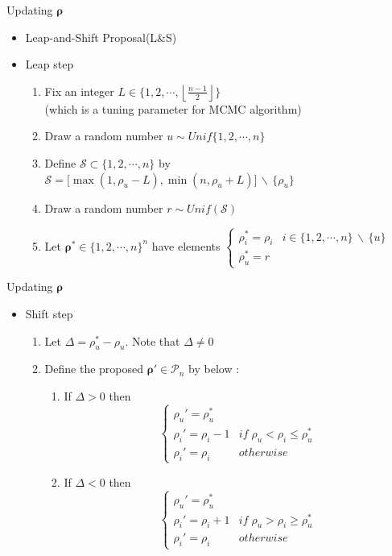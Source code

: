 \documentclass[11pt]{beamer}
\newcommand{\diff}{\,\backslash\,}
\newcommand{\floor}[1]{\left\lfloor #1 \right\rfloor}
\begin{document}
\begin{frame}{Updating $\boldsymbol{\rho}$}
\begin{itemize}
    \item Leap-and-Shift Proposal(L\&S)
    \item Leap step
        \begin{enumerate}
            \item Fix an integer $L\in \{1,2,\cdots, \floor{\frac{n-1}{2}}\}$ \\
            (which is a tuning parameter for MCMC algorithm)
            \item Draw a random number $u\sim Unif\{1,2,\cdots, n\}$
            \item Define $\mathcal{S}\subset \{1,2,\cdots, n\}$ by $\mathcal{S}=\big[\max (1, \rho_u-L), \min (n, \rho_u+L)\big]\diff\{\rho_u\}$
            \item Draw a random number $r\sim Unif(\mathcal{S})$
            \item Let $\boldsymbol{\rho}^*\in \{1,2,\cdots, n\}^n$ have elements $\begin{cases}
            \rho_i^*=\rho_i & i\in \{1,2,\cdots,n\}\diff \{u\} \\\rho_u^*=r \end{cases}$
        \end{enumerate}
\end{itemize}
\end{frame}

\begin{frame}{Updating $\boldsymbol{\rho}$}
\begin{itemize}
    \item Shift step
    \begin{enumerate}
        \item Let $\Delta=\rho_u^*-\rho_u$. Note that $\Delta\neq 0$ 
        \item Define the proposed $\boldsymbol{\rho}'\in \mathcal{P}_n$ by below :
        \begin{enumerate}
            \item If $\Delta>0$ then 
            $$\begin{cases}
                \rho_u'=\rho_u^* \\ \rho_i'=\rho_i-1 & if \; \rho_u<\rho_i\leq \rho_u^* \\ \rho_i'=\rho_i & otherwise
            \end{cases} $$
            \item If $\Delta<0$ then 
            $$\begin{cases}
                \rho_u'=\rho_u^* \\ \rho_i'=\rho_i+1 & if \; \rho_u>\rho_i\geq \rho_u^* \\ \rho_i'=\rho_i & otherwise
            \end{cases} $$
        \end{enumerate} 
    \end{enumerate}
\end{itemize}
\end{frame}
\end{document}

